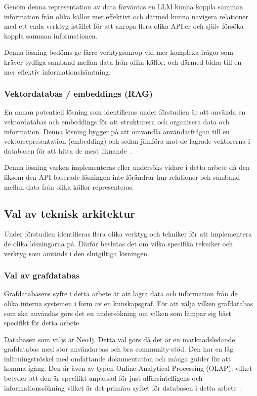 Genom denna representation av data förväntas en LLM kunna koppla samman information från olika källor mer effektivt och därmed kunna navigera relationer med ett enda verktyg istället för att anropa flera olika API:er och själv försöka koppla samman informationen.

Denna lösning bedöms ge färre verktygsanrop vid mer komplexa frågor som kräver tydliga samband mellan data från olika källor, och därmed bidra till en mer effektiv informationshämtning.

\subsubsection{Vektordatabas / embeddings (RAG)}
En annan potentiell lösning som identifieras under förstudien är att använda en vektordatabas och embeddings för att strukturera och organisera data och information.
Denna lösning bygger på att omvandla användarfrågan till en vektorrepresentation (embedding) och sedan jämföra mot de lagrade vektorerna i databasen för att hitta de mest liknande~\cite{1}.

Denna lösning varken implementeras eller undersöks vidare i detta arbete då den liksom den API-baserade lösningen inte förändrar hur relationer och samband mellan data från olika källor representeras.

\subsection{Val av teknisk arkitektur}
Under förstudien identifieras flera olika verktyg och tekniker för att implementera de olika lösningarna på.
Därför beslutas det om vilka specifika tekniker och verktyg som används i den slutgiltiga lösningen.

\subsubsection{Val av grafdatabas}
Grafdatabasens syfte i detta arbete är att lagra data och information från de olika interna systemen i form av en kunskapsgraf.
För att välja vilken grafdatabas som ska användas görs det en undersökning om vilken som lämpar sig bäst specifikt för detta arbete.

Databasen som väljs är Neo4j. Detta val görs då det är en marknadsledande grafdatabas med stor användarbas och bra community-stöd.
Den har en låg inlärningströskel med omfattande dokumentation och många guider för att komma igång. Den är även av typen Online Analytical Processing (OLAP), vilket betyder att den är specifikt anpassad för just affärsintelligens och informationssökning vilket är det primära syftet för databasen i detta arbete~\cite{17}.

